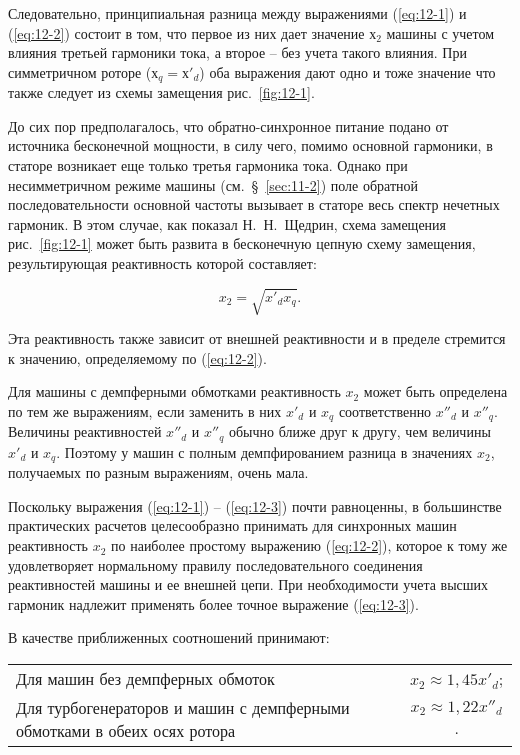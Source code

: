 Следовательно, принципиальная разница между выражениями (\ref{eq:12-1}) и (\ref{eq:12-2}) состоит в том, что первое из них дает значение $ х_2 $ машины с учетом влияния третьей гармоники тока, а второе -- без учета такого влияния. При симметричном роторе ($ х_q = х'_d $) оба выражения дают одно и тоже значение что также следует из схемы замещения рис.~\ref{fig:12-1}.

До сих пор предполагалось, что обратно-синхронное питание подано от источника бесконечной мощности, в силу чего, помимо основной гармоники, в статоре возникает еще только третья гармоника тока. Однако при несимметричном режиме машины (см.~§~\ref{sec:11-2}) поле обратной последовательности основной частоты вызывает в статоре весь спектр нечетных гармоник. В этом случае, как показал Н.~Н.~Щедрин, схема замещения рис.~\ref{fig:12-1} может быть развита в бесконечную цепную схему замещения, результирующая реактивность которой составляет:

\begin{equation}
	x_{2}  = \sqrt{x'_d x_q} \text{.}
	\label{eq:12-3}
\end{equation}

Эта реактивность также зависит от внешней реактивности и в пределе стремится к значению, определяемому по (\ref{eq:12-2}).

Для машины с демпферными обмотками реактивность $ x_2 $ может быть определена по тем же выражениям, если заменить в них $ x'_d $ и $ x_q $ соответственно $ x''_d $ и $ x''_q $. Величины реактивностей $ x''_d $ и $ x''_q $ обычно ближе друг к другу, чем величины $ x'_d $ и $ x_q $. Поэтому у машин с полным демпфированием разница в значениях $ x_2 $, получаемых по разным выражениям, очень мала.

Поскольку выражения (\ref{eq:12-1}) -- (\ref{eq:12-3}) почти равноценны, в большинстве практических расчетов целесообразно принимать для синхронных машин реактивность $ x_2 $ по наиболее простому выражению (\ref{eq:12-2}), которое к тому же удовлетворяет нормальному правилу последовательного соединения реактивностей машины и ее внешней цепи. При необходимости учета высших гармоник надлежит применять более точное выражение (\ref{eq:12-3}).

В качестве приближенных соотношений принимают:

\begin{tabular}{lc}
	Для машин без демпферных обмоток & $ x_2 \approx 1,45 x'_d  $; \\ 
	Для турбогенераторов и машин с демпферными обмотками в обеих осях ротора &  $ x_2 \approx 1,22 x''_d  $. \\ 
\end{tabular} 

